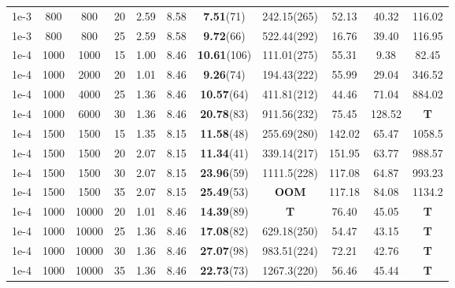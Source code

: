 \documentclass{jcmlatex}
\begin{document}
\begin{table}
\begin{tabular*}{\textwidth}{@{\extracolsep\fill}ccccccccccc}
    1e-3 & 800&800 &20&2.59 &8.58  &\textbf{7.51}(71) &242.15(265)  &52.13 &40.32 &116.02\\
    1e-3 & 800&800 &25&2.59 &8.58  &\textbf{9.72}(66) &522.44(292)  &16.76 &39.40 &116.95\\ 
\midrule    
    1e-4 & 1000&1000 &15&1.00 &8.46  &\textbf{10.61}(106) &111.01(275) &55.31 &9.38 &82.45\\
    1e-4 & 1000&2000 &20&1.01 &8.46  &\textbf{9.26}(74) &194.43(222) &55.99 &29.04 &346.52\\ 
    1e-4 & 1000&4000 &25&1.36 &8.46  &\textbf{10.57}(64) &411.81(212) &44.46 &71.04 &884.02\\ 
    1e-4 & 1000&6000 &30&1.36 &8.46  &\textbf{20.78}(83) &911.56(232) &75.45 &128.52 &\textbf{T}\\
\midrule    
    1e-4 & 1500&1500 &15&1.35 &8.15  &\textbf{11.58}(48) &255.69(280)  &142.02 &65.47&1058.5 \\
    1e-4 & 1500&1500 &20&2.07 &8.15  &\textbf{11.34}(41) &339.14(217)  &151.95 &63.77&988.57 \\ 
    1e-4 & 1500&1500 &30&2.07 &8.15  &\textbf{23.96}(59) &1111.5(228)  &117.08 &64.87&993.23 \\ 
    1e-4 & 1500&1500 &35&2.07 &8.15 &\textbf{25.49}(53) &\textbf{OOM}  &117.18 &84.08 &1134.2  \\ 
\midrule
    1e-4 & 1000&10000 &20&1.01 &8.46  &\textbf{14.39}(89) &\textbf{T}   &76.40  &45.05 &\textbf{T}\\ 
    1e-4 & 1000&10000 &25&1.36 &8.46  &\textbf{17.08}(82) &629.18(250)  &54.47 &43.15&\textbf{T}\\ 
    1e-4 & 1000&10000 &30&1.36 &8.46  &\textbf{27.07}(98) &983.51(224)  &72.21 &42.76&\textbf{T}\\
    1e-4 & 1000&10000 &35&1.36 &8.46  &\textbf{22.73}(73) &1267.3(220) &56.46 &45.44&\textbf{T}\\
\hline
\end{tabular*}
\end{table}
% 
%
\end{document}
